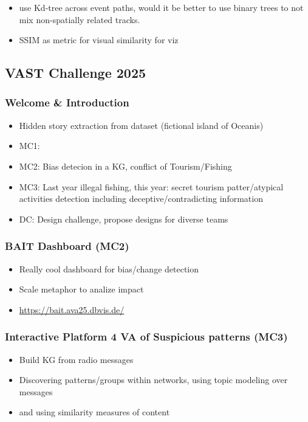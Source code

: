 \documentclass[a4paper]{article}
\begin{document}
\begin{itemize}
    \item use Kd-tree across event paths, would it be better to use binary trees to not mix non-spatially related tracks.
    \item SSIM as metric for visual similarity for viz
\end{itemize}

\subsection{VAST Challenge 2025}

\subsubsection{Welcome \& Introduction}
\begin{itemize}
    \item Hidden story extraction from dataset (fictional island of Oceanis)
    \item MC1:
    \item MC2: Bias detecion in a KG, conflict of Tourism/Fishing
    \item MC3: Last year illegal fishing, this year: secret tourism patter/atypical activities detection including deceptive/contradicting information
    \item DC: Design challenge, propose designs for diverse teams

\end{itemize}

\subsubsection{BAIT Dashboard (MC2)}
\begin{itemize}
    \item Really cool dashboard for bias/change detection
    \item Scale metaphor to analize impact
    \item \url{https://bait.ava25.dbvis.de/}
\end{itemize}

\subsubsection{Interactive Platform 4 VA of Suspicious patterns (MC3)}
\begin{itemize}
    \item Build KG from radio messages
    \item Discovering patterns/groups within networks, using topic modeling over messages
    \item[\ldots] and using similarity measures of content
\end{itemize}
\end{document}
